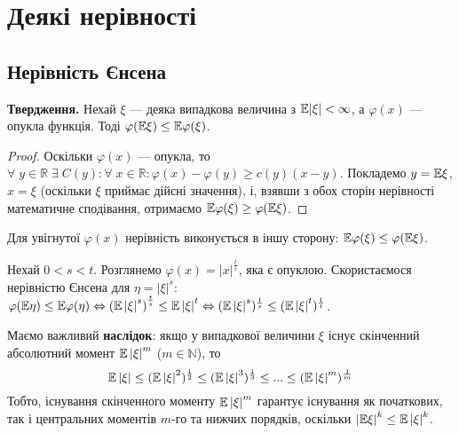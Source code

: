 \section{Деякі нерівності}
\subsection{Нерівність Єнсена}

\noindent\textbf{Твердження.}
Нехай $\xi$ --- деяка випадкова величина
з $\mathbb{E}|\xi| < \infty$, а $\varphi(x)$ --- опукла функція. Тоді $\varphi(\mathbb{E}\xi) \leq \mathbb{E}\varphi(\xi)$.
\begin{proof}
    Оскільки $\varphi(x)$ --- опукла, то $\forall \; y \in \mathbb{R} \;\exists \; C(y): \forall \; x \in \mathbb{R}: \varphi(x) - \varphi(y) \geq c(y)(x-y)$.
    Покладемо $y = \mathbb{E}\xi$, $x = \xi$ (оскільки $\xi$ приймає дійсні значення), і, взявши з обох сторін нерівності математичне сподівання,
    отримаємо $\mathbb{E}\varphi(\xi) \geq \varphi(\mathbb{E}\xi)$. 
\end{proof}
\begin{remark}
    Для увігнутої $\varphi(x)$ нерівність виконується в іншу сторону: $\mathbb{E}\varphi(\xi) \leq \varphi(\mathbb{E}\xi)$.
\end{remark}
\begin{example}
    Нехай $0 < s < t$. Розглянемо $\varphi(x) = |x|^{\frac{t}{s}}$, яка є опуклою. Скористаємося нерівністю
    Єнсена для $\eta = \left| \xi\right|^s$:
    $\varphi(\mathbb{E}\eta) \leq \mathbb{E}\varphi(\eta) \Leftrightarrow \left( \mathbb{E} \left| \xi\right|^s\right)^{\frac{t}{s}} \leq \mathbb{E} \left| \xi\right|^t 
    \Leftrightarrow ( \mathbb{E} \left| \xi\right|^s)^{\frac{1}{s}} \leq ( \mathbb{E} \left| \xi\right|^t)^{\frac{1}{t}}$.

    Маємо важливий \textbf{наслідок}: якщо у випадкової величини $\xi$ існує скінченний абсолютний момент $\mathbb{E}\left|\xi\right|^m$ ($m\in \mathbb{N}$), то
    \begin{equation}\label{eq:moments_ineq}
        \mathbb{E} \left| \xi\right| \leq (\mathbb{E} \left| \xi\right|^2)^{\frac{1}{2}} \leq (\mathbb{E} \left| \xi\right|^3)^{\frac{1}{3}} \leq ... \leq ( \mathbb{E} \left| \xi\right|^m)^{\frac{1}{m}}    
    \end{equation}
    Тобто, існування скінченного моменту $\mathbb{E}\left|\xi\right|^m$ гарантує існування як початкових, так і центральних моментів $m$-го та нижчих порядків,
    оскільки $\left| \mathbb{E}\xi \right|^k \leq \mathbb{E}\left|\xi\right|^k$.
\end{example}

